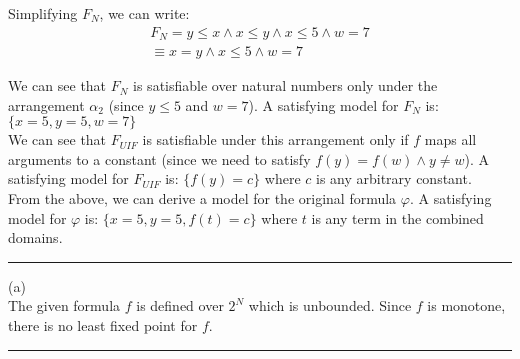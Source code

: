 \documentclass[12pt,letterpaper, onecolumn]{exam}
\begin{document}
\begin{questions}
	Simplifying $F_N$, we can write:
	\begin{align*}
		F_N = y \le x \land x \le y \land x \le 5 \land w = 7 \\
			\equiv x = y \land x \le 5 \land w = 7
	\end{align*}

	We can see that $F_N$ is satisfiable over natural numbers only under the arrangement $\alpha_2$ (since $y \le 5$ and $w=7$).
	A satisfying model for $F_N$ is:  $ \{x = 5, y = 5, w = 7\} $ \\

	We can see that $F_{UIF}$ is satisfiable under this arrangement only if $f$ maps all arguments to a constant (since we need to satisfy
	$ f(y) = f(w) \land y \neq w $).
	A satisfying model for $F_{UIF}$ is: $ \{f(y) = c \} $ where $c$ is any arbitrary constant. \\

	From the above, we can derive a model for the original formula $ \varphi $.
	A satisfying model for $ \varphi $ is: $ \{x = 5, y = 5, f(t) = c \} $ where $t$ is any term in the combined domains.


    {\rule{17cm}{0.4pt}}

	\question[]
	\solutiontitle

	(a) \\
	The given formula $ f $  is defined over $2^{N}$ which is unbounded.
	Since $ f $ is monotone, there is no least fixed point for $ f $.


    {\rule{17cm}{0.4pt}}

\end{questions}
\end{document}

